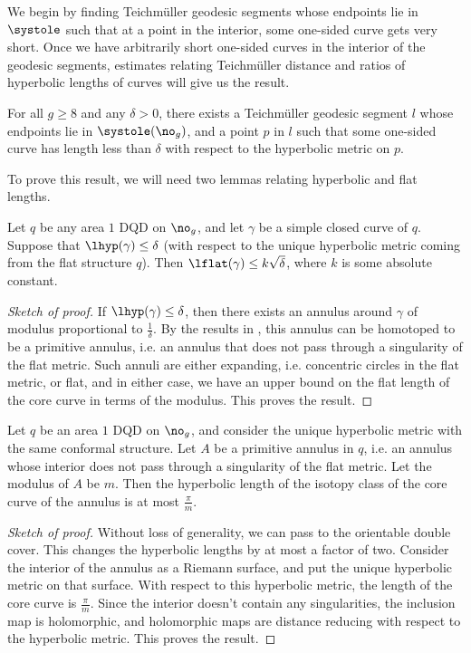 \documentclass[12pt, reqno]{amsart}
\begin{document}
We begin by finding Teichmüller geodesic segments whose endpoints lie in $\systole$ such that at a point in the interior, some one-sided curve gets very short.
Once we have arbitrarily short one-sided curves in the interior of the geodesic segments, estimates relating Teichmüller distance and ratios of hyperbolic lengths of curves will give us the result.
\begin{proposition}
  \label{prop:very-short-curves}
  For all $g \geq 8$ and any $\delta > 0$, there exists a Teichmüller geodesic segment $l$ whose endpoints lie in $\systole(\no_g)$, and a point $p$ in $l$ such that some one-sided curve has length less than $\delta$ with respect to the hyperbolic metric on $p$.
\end{proposition}

To prove this result, we will need two lemmas relating hyperbolic and flat lengths.
\begin{lemma}
  \label{lem: relating-flat-hyperbolic}
  Let $q$ be any area $1$ DQD on $\no_g$, and let $\gamma$ be a simple closed curve of $q$.
  Suppose that $\lhyp(\gamma) \leq \delta$ (with respect to the unique hyperbolic metric coming from the flat structure $q$).
  Then $\lflat(\gamma) \leq k \sqrt{\delta}$, where $k$ is some absolute constant.
\end{lemma}
\begin{proof}[Sketch of proof]
  If $\lhyp(\gamma) \leq \delta$, then there exists an annulus around $\gamma$ of modulus proportional to $\frac{1}{\delta}$.
  By the results in \cite{Minsky1992HarmonicML}, this annulus can be homotoped to be a primitive annulus, i.e. an annulus that does not pass through a singularity of the flat metric.
  Such annuli are either expanding, i.e. concentric circles in the flat metric, or flat, and in either case, we have an upper bound on the flat length of the core curve in terms of the modulus.
  This proves the result.
\end{proof}

\begin{lemma}
  \label{lem:schwarz}
  Let $q$ be an area $1$ DQD on $\no_g$, and consider the unique hyperbolic metric with the same conformal structure.
  Let $A$ be a primitive annulus in $q$, i.e. an annulus whose interior does not pass  through a singularity of the flat metric.
  Let the modulus of $A$ be $m$.
  Then the hyperbolic length of the isotopy class of the core curve of the annulus is at most $\frac{\pi}{m}$.
\end{lemma}
\begin{proof}[Sketch of proof]
  Without loss of generality, we can pass to the orientable double cover.
  This changes the hyperbolic lengths by at most a factor of two.
  Consider the interior of the annulus as a Riemann surface, and put the unique hyperbolic metric on that surface.
  With respect to this hyperbolic metric, the length of the core curve is $\frac{\pi}{m}$. Since the interior doesn't contain any singularities, the inclusion map is holomorphic, and holomorphic maps are distance reducing with respect to the hyperbolic metric.
  This proves the result.
\end{proof}
\end{document}
